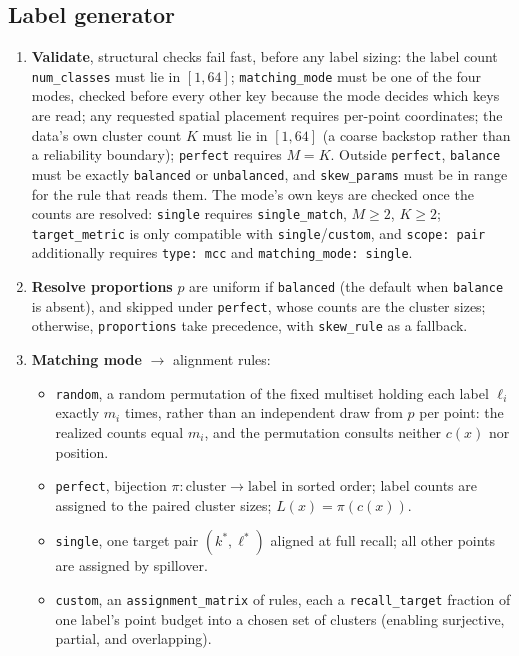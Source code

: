 \documentclass[a4paper,12pt]{article}
\begin{document}
\subsection{Label generator}
\begin{enumerate}
    \item \textbf{Validate}, structural checks fail fast, before any label sizing: the label count \texttt{num\_classes} must lie in $[1,64]$; \texttt{matching\_mode} must be one of the four modes, checked before every other key because the mode decides which keys are read; any requested spatial placement requires per-point coordinates; the data's own cluster count $K$ must lie in $[1,64]$ (a coarse backstop rather than a reliability boundary); \texttt{perfect} requires $M = K$. Outside \texttt{perfect}, \texttt{balance} must be exactly \texttt{balanced} or \texttt{unbalanced}, and \texttt{skew\_params} must be in range for the rule that reads them. The mode's own keys are checked once the counts are resolved: \texttt{single} requires \texttt{single\_match}, $M \ge 2$, $K \ge 2$; \texttt{target\_metric} is only compatible with \texttt{single}/\texttt{custom}, and \texttt{scope: pair} additionally requires \texttt{type: mcc} and \texttt{matching\_mode: single}.
    \item \textbf{Resolve proportions} $p$ are uniform if \texttt{balanced} (the default when \texttt{balance} is absent), and skipped under \texttt{perfect}, whose counts are the cluster sizes; otherwise, \texttt{proportions} take precedence, with \texttt{skew\_rule} as a fallback.
    \item \textbf{Matching mode} $\to$ alignment rules:
    \begin{itemize}
        \item \texttt{random}, a random permutation of the fixed multiset holding each label $\ell_i$ exactly $m_i$ times, rather than an independent draw from $p$ per point: the realized counts equal $m_i$, and the permutation consults neither $c(x)$ nor position.
        \item \texttt{perfect}, bijection $\pi: \text{cluster} \to \text{label}$ in sorted order; label counts are assigned to the paired cluster sizes; $L(x) = \pi(c(x))$.
        \item \texttt{single}, one target pair $(k^*, \ell^*)$ aligned at full recall; all other points are assigned by spillover.
        \item \texttt{custom}, an \texttt{assignment\_matrix} of rules, each a \texttt{recall\_target} fraction of one label's point budget into a chosen set of clusters (enabling surjective, partial, and overlapping).

\end{itemize}
\end{enumerate}
\end{document}
